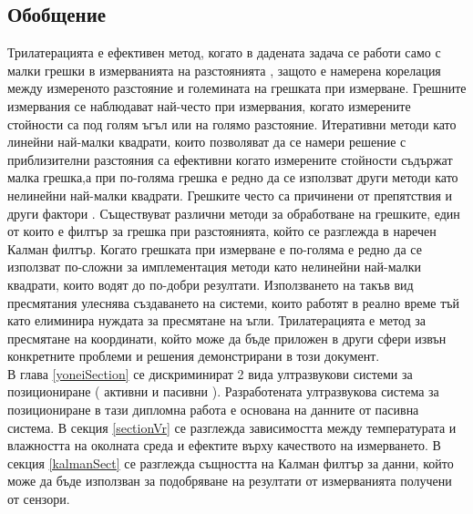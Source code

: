 \subsection{Обобщение}

Трилатерацията е ефективен метод, когато в дадената задача се работи само с малки грешки в измерванията на разстоянията \cite{trilat}, защото е намерена корелация между измереното разстояние и големината на грешката при измерване. Грешните измервания се наблюдават най-често при измервания, когато измерените стойности са под голям ъгъл или на голямо разстояние. Итеративни методи като линейни най-малки квадрати, които позволяват да се намери решение с приблизителни разстояния са ефективни когато измерените стойности съдържат малка грешка,а при по-голяма грешка е редно да се използват други методи като нелинейни най-малки квадрати. Грешките често са причинени от препятствия и други фактори \cite{yonei}. Съществуват различни методи за обработване на грешките, един от които е филтър за грешка при разстоянията, който се разглежда в \cite{yonei} наречен Калман филтър. Когато грешката при измерване е по-голяма е редно да се използват по-сложни за имплементация методи като нелинейни най-малки квадрати, които водят до по-добри резултати. Използването на такъв вид пресмятания улеснява създаването на системи, които работят в реално време тъй като елиминира нуждата за пресмятане на ъгли. Трилатерацията е метод за пресмятане на координати, който може да бъде приложен в други сфери извън конкретните проблеми и решения демонстрирани в този документ. \\В глава \ref{yoneiSection} се дискриминират 2 вида ултразвукови системи за позициониране ( активни и пасивни ). Разработената ултразвукова система за позициониране в тази дипломна работа е основана на данните от пасивна система. В секция \ref{sectionVr} се разглежда зависимостта между температурата и влажността на околната среда и ефектите върху качеството на измерването. В секция \ref{kalmanSect} се разглежда същността на Калман филтър за данни, който може да бъде използван за подобряване на резултати от измерванията получени от сензори. 